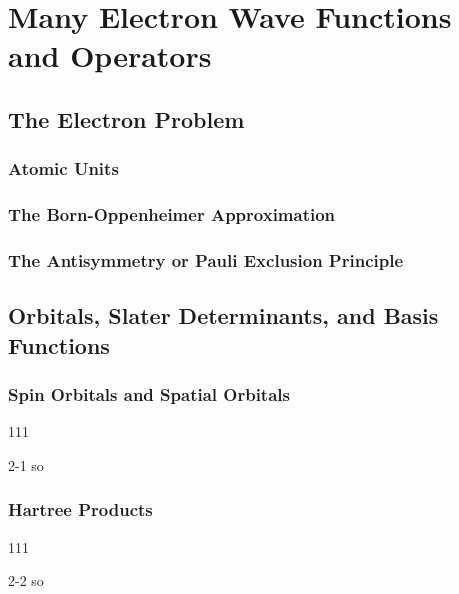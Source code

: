 \documentclass[a4paper]{book}
\begin{document}

	\chapter{Many Electron Wave Functions and Operators}
	
	\section{The Electron Problem}
	
	\subsection{Atomic Units}
	
	\subsection{The Born-Oppenheimer Approximation}
	
	\subsection{The Antisymmetry or Pauli Exclusion Principle}
	
	\section{Orbitals, Slater Determinants, and Basis Functions}
	
	\subsection{Spin Orbitals and Spatial Orbitals}
	
	\begin{exercise}
	111
	\end{exercise}
	
	\begin{solution}
		2-1 so
	\end{solution}
	
	\subsection{Hartree Products}
	
	\begin{exercise}
	111
	\end{exercise}
	
	\begin{solution}
		2-2 so
	\end{solution}
	
\end{document}
